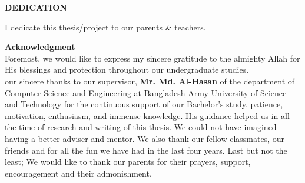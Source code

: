 \documentclass[12pt,a4paper]{report}
\begin{document}
\begin{titlepage}
	
	\newpage
	\begin{center}
	\textbf{DEDICATION}
	\end{center}
	\vspace{.2em}
	\begin{center}
	I dedicate this thesis/project to our parents \& teachers.
	\end{center}
\end{titlepage}

	\thispagestyle{fancy}
	\setcounter{page}{6}
	\tableofcontents\thispagestyle{fancy}\newpage
	\listoffigures\thispagestyle{fancy}\newpage
	\listoftables\thispagestyle{fancy}\newpage
	
	\begin{titlepage}
	\vspace*{.05cm}	
		\thispagestyle{fancy}
		\setcounter{page}{10}
		\centering 
		{\fontsize{20}{10}\selectfont \textbf{Acknowledgment}}\\
		\vspace{0.6cm}
		\justify Foremost, we would like to express my sincere gratitude to the almighty Allah for His blessings and protection throughout our undergraduate studies.\\ 
our sincere thanks to our supervisor,  \textbf{Mr. Md. Al-Hasan} of the department of Computer Science and Engineering at Bangladesh Army University of Science and Technology for the continuous support of our Bachelor's study, patience, motivation, enthusiasm, and immense knowledge. His guidance helped us in all the time of research and writing of this thesis. We could not have imagined having a better adviser and mentor. We also thank our fellow classmates, our friends and for all the fun we have had in the last four years.
        Last but not the least; We would like to thank our parents for their prayers, support, encouragement and their admonishment. 
		
	\newpage
	
	\centering 
	

\end{titlepage}
\end{document}
